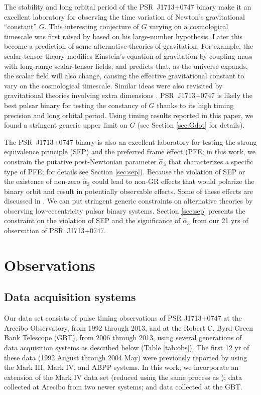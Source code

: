 The stability and long orbital period of the PSR~J1713+0747 binary make it an
excellent laboratory for observing the time variation of Newton's gravitational ``constant'' $G$. 
This interesting conjecture of $G$ varying on a cosmological timescale was first 
raised by \citet{dir37} based on his large-number hypothesis. 
Later this become a prediction of some alternative theories of gravitation. 
For example, the scalar-tensor theory \citep{jor55,jor59,fie56,bd61} 
modifies Einstein's equation of gravitation by coupling mass with
long-range scalar-tensor fields, and predicts that, as the universe expands,
the scalar field will also change, causing the effective gravitational constant to vary  
on the cosmological timescale. 
Similar ideas were also revisited by gravitational theories involving extra dimensions
\citep{mar84,ww86a}.
PSR~J1713+0747 is likely the best pulsar binary for testing the constancy of
$G$ thanks to its high timing precision and long orbital period. Using timing
results reported in this paper, we found a stringent generic upper limit on 
$\dot{G}$ (see Section \ref{sec:Gdot} for details). 

The PSR~J1713+0747 binary is also an excellent laboratory for testing 
the strong equivalence principle (SEP) and the preferred
frame effect (PFE; in this work, we constrain the putative post-Newtonian
parameter $\hat{\alpha}_3$ that characterizes a specific type of PFE; for
details see Section \ref{sec:sep}). 
Because the violation of SEP or the existence of non-zero $\hat{\alpha}_3$
could lead to non-GR effects that would polarize the
binary orbit and result in potentially observable effects. Some of these
effects are discussed in \citep{fkw12, will14}. We can put stringent generic
constraints on alternative theories by observing
low-eccentricity pulsar binary systems. Section \ref{sec:sep} presents the
constraint on the violation of SEP and the significance of $\hat{\alpha}_3$ from our 21 yrs of observation of PSR~J1713+0747.

\section{Observations}
\subsection{Data acquisition systems}


Our data set consists of pulse timing observations of PSR J1713+0747 at the
Arecibo Observatory, from 1992 through 2013, and at the Robert C. Byrd Green Bank
Telescope (GBT), from 2006 through 2013, using several generations of
data acquisition systems as described below (Table \ref{tab:obs}).  The first 12 yr of
these data (1992 August through 2004 May) were previously reported by
\citet{sns+05} using the Mark III, Mark IV, and ABPP systems.  In
this work, we incorporate an extension of the Mark IV data set (reduced
using the same process as \citealt{sns+05}); data collected at Arecibo
from two newer systems; and data collected at the GBT.

